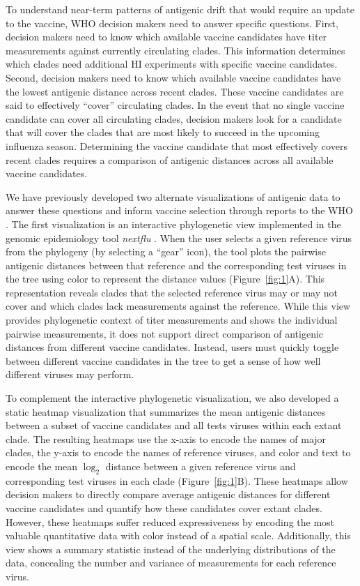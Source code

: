 \documentclass[utf8]{FrontiersinHarvard} %
\begin{document}
To understand near-term patterns of antigenic drift that would require an update to the vaccine, WHO decision makers need to answer specific questions.
First, decision makers need to know which available vaccine candidates have titer measurements against currently circulating clades.
This information determines which clades need additional HI experiments with specific vaccine candidates.
Second, decision makers need to know which available vaccine candidates have the lowest antigenic distance across recent clades.
These vaccine candidates are said to effectively ``cover'' circulating clades.
In the event that no single vaccine candidate can cover all circulating clades, decision makers look for a candidate that will cover the clades that are most likely to succeed in the upcoming influenza season.
Determining the vaccine candidate that most effectively covers recent clades requires a comparison of antigenic distances across all available vaccine candidates.

We have previously developed two alternate visualizations of antigenic data to answer these questions and inform vaccine selection through reports to the WHO \citep{BedfordWHO2018,BedfordWHO2019}.
The first visualization is an interactive phylogenetic view implemented in the genomic epidemiology tool \emph{nextflu} \citep{NeherBedford2015,NeherBedford2018}.
When the user selects a given reference virus from the phylogeny (by selecting a ``gear'' icon), the tool plots the pairwise antigenic distances between that reference and the corresponding test viruses in the tree using color to represent the distance values (Figure~\ref{fig:1}A).
This representation reveals clades that the selected reference virus may or may not cover and which clades lack measurements against the reference.
While this view provides phylogenetic context of titer measurements and shows the individual pairwise measurements, it does not support direct comparison of antigenic distances from different vaccine candidates.
Instead, users must quickly toggle between different vaccine candidates in the tree to get a sense of how well different viruses may perform.

To complement the interactive phylogenetic visualization, we also developed a static heatmap visualization that summarizes the mean antigenic distances between a subset of vaccine candidates and all tests viruses within each extant clade.
The resulting heatmaps use the x-axis to encode the names of major clades, the y-axis to encode the names of reference viruses, and color and text to encode the mean $\log_{2}$ distance between a given reference virus and corresponding test viruses in each clade (Figure~\ref{fig:1}B).
These heatmaps allow decision makers to directly compare average antigenic distances for different vaccine candidates and quantify how these candidates cover extant clades.
However, these heatmaps suffer reduced expressiveness by encoding the most valuable quantitative data with color instead of a spatial scale.
Additionally, this view shows a summary statistic instead of the underlying distributions of the data, concealing the number and variance of measurements for each reference virus.
\end{document}
